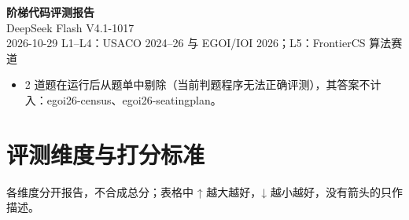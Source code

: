 \documentclass[11pt,a4paper,fontset=none]{ctexart}
\begin{document}
\begin{center}
{\LARGE\bfseries 阶梯代码评测报告}\\[0.5em]
{\Large DeepSeek Flash V4.1-1017}\\[0.4em]
{\small 2026-10-29 \quad L1--L4：USACO 2024--26 与 EGOI/IOI 2026；L5：FrontierCS 算法赛道}
\end{center}
\begin{itemize}
\item 2 道题在运行后从题单中剔除（当前判题程序无法正确评测），其答案不计入：egoi26-census、egoi26-seatingplan。
\end{itemize}
\section{评测维度与打分标准}
各维度分开报告，不合成总分；表格中 ↑ 越大越好，↓ 越小越好，没有箭头的只作描述。
\end{document}
